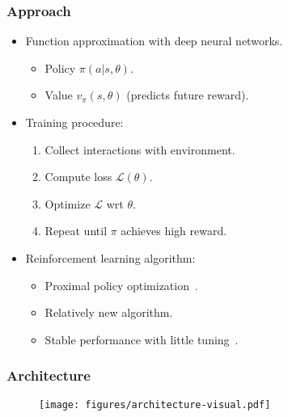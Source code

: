 \begin{frame}
    \frametitle{Approach}

    \begin{itemize}
        \item Function approximation with deep neural networks.
        \begin{itemize}
            \item Policy \(\pi(a | s, \theta)\).
            \item Value \(v_\pi(s, \theta)\) (predicts future reward).
        \end{itemize}
        \item Training procedure:
        \begin{enumerate}
            \item Collect interactions with environment.
            \item Compute loss \(\mathcal{L(\theta)}\).
            \item Optimize \(\mathcal{L}\) wrt \(\theta\).
            \item Repeat until \(\pi\) achieves high reward.
        \end{enumerate}
        \item Reinforcement learning algorithm:
        \begin{itemize}
            \item Proximal policy optimization~\cite{schulman_proximal_2017}.
            \item Relatively new algorithm.
            \item Stable performance with little tuning~\cite{henderson_deep_2018}.
        \end{itemize}

    \end{itemize}
\end{frame}

\begin{frame}
    \frametitle{Architecture}

    \begin{figure}
        \centering
        \texttt{[image: figures/architecture-visual.pdf]}
    \end{figure}

\end{frame}

